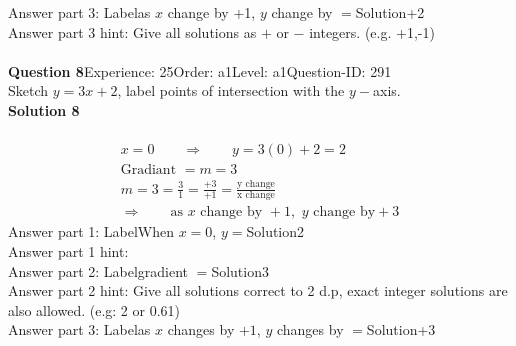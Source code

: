\documentclass{article}
\begin{document}
Answer part 3: \hspace{10pt}Label\hspace{10pt}as $x$ change by +1, $y$ change by $=$\hspace{10pt}Solution\hspace{10pt}+2\\
Answer part 3 hint: \hspace{15pt}Give all solutions as $+$ or $-$ integers. (e.g. +1,-1)\\
\\[4pt]
\noindent\textbf{Question 8}\hspace{20pt}Experience: 25\hspace{20pt}Order: a1\hspace{20pt}Level: a1\hspace{20pt}Question-ID: 291\\[2pt]
Sketch $y=3x+2$, label points of intersection with the $y-$axis.\\[4pt]
\noindent\textbf{Solution 8}\\[2pt]
\\[-35pt]\begin{align*}
&x=0\qquad\Rightarrow\qquad y=3(0)+2=2&\\[2pt]
&\text{Gradiant}\,\,=m=3&\\[2pt]
&m=3=\displaystyle\frac{3}{1}=\displaystyle\frac{+3}{+1}=\displaystyle\frac{\text{y change}}{\text{x change}}&\\[2pt]
& \Rightarrow\qquad \text{as}\,\, x \,\,\text{change by } +1,\,\, y\,\, \text{change by} +3 &
\end{align*}
Answer part 1: \hspace{10pt}Label\hspace{10pt}When $x=0$, $y=$\hspace{10pt}Solution\hspace{10pt}2\\
Answer part 1 hint: \hspace{15pt}\\
Answer part 2: \hspace{10pt}Label\hspace{10pt}gradient $=$\hspace{10pt}Solution\hspace{10pt}3\\
Answer part 2 hint: \hspace{15pt}Give all solutions correct to 2 d.p, exact integer solutions are also allowed. (e.g: 2 or 0.61)\\
Answer part 3: \hspace{10pt}Label\hspace{10pt}as $x$ changes by $+1$, $y$ changes by $=$\hspace{10pt}Solution\hspace{10pt}+3\\
\end{document}
